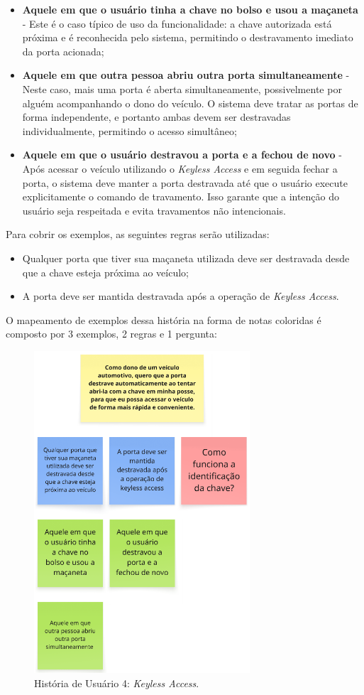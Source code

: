 \begin{itemize}
    \item \textbf{Aquele em que o usuário tinha a chave no bolso e usou a maçaneta} - Este é o caso típico de uso da funcionalidade: a chave autorizada está próxima e é reconhecida pelo sistema, permitindo o destravamento imediato da porta acionada;
    \item \textbf{Aquele em que outra pessoa abriu outra porta simultaneamente} - Neste caso, mais uma porta é aberta simultaneamente, possivelmente por alguém acompanhando o dono do veículo. O sistema deve tratar as portas de forma independente, e portanto ambas devem ser destravadas individualmente, permitindo o acesso simultâneo;
    \item \textbf{Aquele em que o usuário destravou a porta e a fechou de novo} - Após acessar o veículo utilizando o \textit{Keyless Access} e em seguida fechar a porta, o sistema deve manter a porta destravada até que o usuário execute explicitamente o comando de travamento. Isso garante que a intenção do usuário seja respeitada e evita travamentos não intencionais.
\end{itemize}

Para cobrir os exemplos, as seguintes regras serão utilizadas:

\begin{itemize}
    \item Qualquer porta que tiver sua maçaneta utilizada deve ser destravada desde que a chave esteja próxima ao veículo;
    \item A porta deve ser mantida destravada após a operação de \textit{Keyless Access}.
\end{itemize}

O mapeamento de exemplos dessa história na forma de notas coloridas é composto por 3 exemplos, 2 regras e 1 pergunta:

\begin{figure}[H]
\centering
\includegraphics[height=12cm]{figuras/user_story_4.png}
\caption{História de Usuário 4: \textit{Keyless Access}.}
\label{fig:historia4}
\end{figure}

